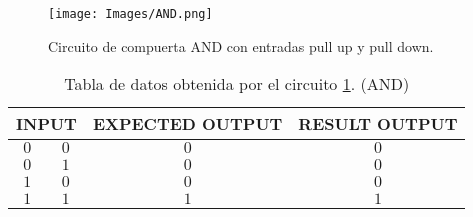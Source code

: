 \begin{figure}[H]
	\centering
	\label{ANDi}
	\texttt{[image: Images/AND.png]}
	\caption{Circuito de compuerta AND con entradas pull up y pull down.}
\end{figure}


\begin{table}[H]
	\centering
	\caption{Tabla de datos obtenida por el circuito \ref{ANDi}. (AND)}
	\label{XOR}
	\begin{tabular}{||c|c||c|c||}
		\hline
		\hline
		\multicolumn{2}{||c||}{INPUT} & EXPECTED OUTPUT & RESULT OUTPUT \\
		\hline
		\hline
		$0$ & $0$ & $0$ & $0$ \\
		$0$ & $1$ & $0$ & $0$ \\
		$1$ & $0$ & $0$ & $0$ \\		
		$1$ & $1$ & $1$ & $1$ \\
		\hline
		\hline
	\end{tabular}
\end{table}












































